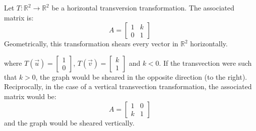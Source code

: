 \begin{eg}
    Let $T: \mathbb{R}^2 \to \mathbb{R}^2$ be a horizontal transversion transformation. The associated matrix is:
    \[
        A = \begin{bmatrix} 1 & k \\ 0 & 1 \end{bmatrix}
    \]
    Geometrically, this transformation shears every vector in $\mathbb{R}^2$ horizontally.
    \begin{center}
    \end{center}
    where $T(\vec{u}) = \begin{bmatrix} 1 \\ 0 \end{bmatrix}$, $T(\vec{v}) = \begin{bmatrix} k \\ 1 \end{bmatrix}$ and $k < 0$. If the transvection were such that $k > 0$, the graph would be sheared in the opposite direction (to the right). \\
    Reciprocally, in the case of a vertical transvection transformation, the associated matrix would be:
    \[
        A = \begin{bmatrix} 1 & 0 \\ k & 1 \end{bmatrix}
    \]
    and the graph would be sheared vertically.
\end{eg}

